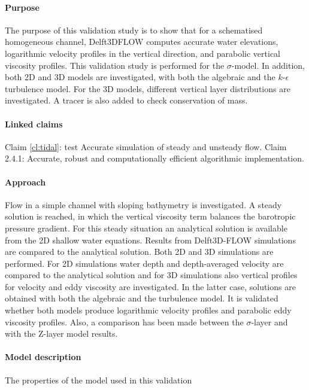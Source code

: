 \label{case:channelflow_simple}
\paragraph*{Purpose}
The purpose of this validation study is to show that for a schematised homogeneous channel, Delft3DFLOW
computes accurate water elevations, logarithmic velocity profiles in the vertical direction, and
parabolic vertical viscosity profiles. This validation study is performed for the $\sigma$-model. In addition, both
2D and 3D models are investigated, with both the algebraic and the \mbox{$k$-$\epsilon$} turbulence model. For the 3D
models, different vertical layer distributions are investigated. A tracer is also added to check conservation
of mass.

\paragraph*{Linked claims}
Claim \ref{cl:tidal}: test Accurate simulation of steady and unsteady flow.
Claim 2.4.1: Accurate, robust and computationally efficient algorithmic implementation.

\paragraph*{Approach}
Flow in a simple channel with sloping bathymetry is investigated. A steady solution is reached, in
which the vertical viscosity term balances the barotropic pressure gradient. For this steady situation
an analytical solution is available from the 2D shallow water equations. Results from Delft3D-FLOW
simulations are compared to the analytical solution. Both 2D and 3D simulations are performed. For 2D
simulations water depth and depth-averaged velocity are compared to the analytical solution and for
3D simulations also vertical profiles for velocity and eddy viscosity are investigated. In the latter case,
solutions are obtained with both the algebraic and the turbulence model. It is validated whether
both models produce logarithmic velocity profiles and parabolic eddy viscosity profiles. Also, a comparison
has been made between the $\sigma$-layer and with the Z-layer model results.

\paragraph*{Model description}
The properties of the model used in this validation

